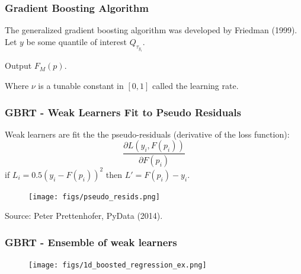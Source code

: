 \documentclass[t, pdftex]{beamer}
\begin{document}
\begin{frame}[shrink=20]
\frametitle{Gradient Boosting Algorithm}

The generalized gradient boosting algorithm was developed by Friedman (1999).
Let $y$ be some quantile of interest $Q_{\tau_{y_i}}$.
\begin{algorithm}[H]

Output $F_M(p).$
\end{algorithm}
Where $\nu$ is a tunable constant in $[0, 1]$ called the learning rate.
\end{frame}

\begin{frame}
\frametitle{GBRT - Weak Learners Fit to Pseudo Residuals}
Weak learners are fit the the pseudo-residuals (derivative of the loss function): 
\[
\frac{\partial L(y_i, F(p_i))}{\partial F(p_i)}
\]
if $L_i=0.5(y_i-F(p_i))^2$ then $L' = F(p_i)-y_i$.  
\begin{figure}[!htbp]
\centering
\texttt{[image: figs/pseudo\_resids.png]}
\label{model_overview}
\end{figure}
Source: Peter Prettenhofer, PyData (2014).
\end{frame}

\begin{frame}
\frametitle{GBRT - Ensemble of weak learners}

\begin{figure}[!htbp]
\centering
\texttt{[image: figs/1d\_boosted\_regression\_ex.png]}
\label{model_overview}
\end{figure}
\end{frame}
\end{document}
